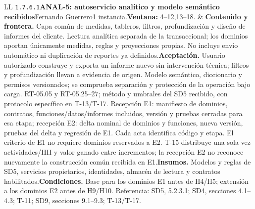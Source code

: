 \begin{longtable}{L{\tabcolsep\relax}L{\tabcolsep\relax}}
\texttt{1.\allowbreak{}7.\allowbreak{}6.\allowbreak{}1}\newline{}\textbf{ANAL-5: autoservicio analítico y modelo semántico recibidos}\newline{}Fernando Guerrero\newline{}1 instancia.\newline{}\textbf{Ventana:} 4--12,13--18. & \textbf{Contenido y frontera.} Capa común de medidas, tableros, filtros, profundización y diseño de informes del cliente. Lectura analítica separada de la transaccional; los dominios aportan únicamente medidas, reglas y proyecciones propias. No incluye envío automático ni duplicación de reportes ya definidos.\newline{}\textbf{Aceptación.} Usuario autorizado construye y exporta un informe nuevo sin intervención técnica; filtros y profundización llevan a evidencia de origen. Modelo semántico, diccionario y permisos versionados; se comprueba separación y protección de la operación bajo carga. RT-05.05 y RT-05.25--27; método y umbrales del SD5 recibido, con protocolo específico en T-13/T-17. Recepción E1: manifiesto de dominios, contratos, funciones/datos/informes incluidos, versión y pruebas cerradas para esa etapa; recepción E2: delta nominal de dominios y funciones, nueva versión, pruebas del delta y regresión de E1. Cada acta identifica código y etapa. El criterio de E1 no requiere dominios reservados a E2. T-15 distribuye una sola vez actividades/HH y valor ganado entre incrementos; la recepción E2 no reconoce nuevamente la construcción común recibida en E1.\newline{}\textbf{Insumos.} Modelos y reglas de SD5, servicios propietarios, identidades, almacén de lectura y contratos habilitados.\newline{}\textbf{Condiciones.} Base para los dominios E1 antes de H4/H5; extensión a los dominios E2 antes de H9/H10. Referencia: SD5, 5.2.3.1; SD4, secciones 4.1--4.3; T-11; SD9, secciones 9.1--9.3; T-13/T-17.\\\hline

\end{longtable}
